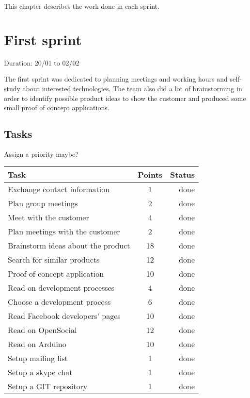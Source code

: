 
This chapter describes the work done in each sprint.

\section{First sprint}

Duration: 20/01 to 02/02

The first sprint was dedicated to planning meetings and working hours
and self-study about interested technologies. The team also did a lot of
brainstorming in order to identify possible product ideas to show the
customer and produced some small proof of concept applications.

\subsection{Tasks}

Assign a priority maybe?

\begin{table}
\begin{tabular}{ | l | c | r | }

\hline
\textbf{Task} & \textbf{Points} & \textbf{Status} \\
\hline

Exchange contact information		& 1  & done \\
\hline
Plan group meetings					& 2  & done \\
\hline
Meet with the customer				& 4  & done \\
\hline
Plan meetings with the customer		& 2  & done \\
\hline
Brainstorm ideas about the product	& 18 & done \\
\hline
Search for similar products			& 12 & done \\
\hline
Proof-of-concept application		& 10 & done \\
\hline
Read on development processes		& 4  & done \\
\hline
Choose a development process		& 6  & done \\
\hline
Read Facebook developers' pages		& 10 & done \\
\hline
Read on OpenSocial					& 12 & done \\
\hline
Read on Arduino						& 10 & done \\
\hline
Setup mailing list					& 1  & done \\
\hline
Setup a skype chat					& 1  & done \\
\hline
Setup a GIT repository				& 1  & done \\
\hline

\end{tabular}
\end{table}


